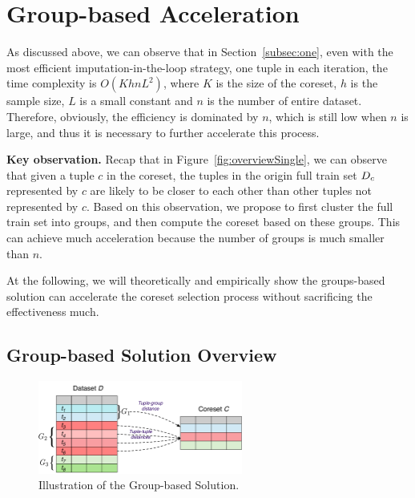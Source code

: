 

\section{Group-based Acceleration}

As discussed above, we can observe that in Section~\ref{subsec:one}, even with the most efficient imputation-in-the-loop  strategy, \ie  one tuple in  each iteration, the time complexity is  $O(KhnL^2)$, where $K$ is the size of the coreset, $h$ is the sample size, $L$ is a small constant and $n$ is the number of entire dataset. Therefore, obviously, the efficiency is dominated by $n$, which is still low when $n$ is large, and thus it  is necessary to further accelerate this process.

\noindent \textbf{Key observation.}   Recap that in Figure~\ref{fig:overviewSingle}, we can observe that  given a tuple $c$ in the coreset, the tuples in the origin full train set $D_c$ represented by $c$ are likely to be  closer to each other than other tuples not represented by $c$.
Based on this observation, we propose to first cluster the full train set into groups, and then compute the coreset based on these groups. This can achieve much acceleration because the number of groups is much smaller than $n$. 

At the following, we will theoretically and empirically show the groups-based solution can accelerate the coreset selection process without sacrificing the effectiveness much.


\subsection{Group-based Solution Overview}

\begin{figure}[t]
    \centering
    \includegraphics[width=0.6\textwidth]{figs/Overview-gb}
    \caption{Illustration of the Group-based Solution.}
    \label{fig:overview-gb}
\end{figure}

